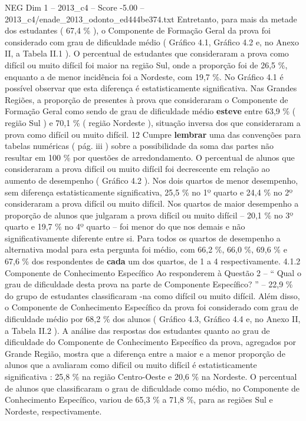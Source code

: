 \begin{textsample}{NEG Dim 1 – 2013\_c4 – Score -5.00 – 2013\_c4/enade\_2013\_odonto\_ed444be374.txt}
Entretanto, para mais da metade dos estudantes ( 67,4 \% ), o Componente de Formação Geral da prova foi considerado com grau de dificuldade médio ( Gráfico 4.1, Gráfico 4.2 e, no Anexo II, a Tabela II.1 ).
O percentual de estudantes que consideraram a prova como difícil ou muito difícil foi maior na região Sul, onde a proporção foi de 26,5 \%, enquanto a de menor incidência foi a Nordeste, com 19,7 \%.
No Gráfico 4.1 é possível observar que esta diferença é estatisticamente significativa.
Nas Grandes Regiões, a proporção de presentes à prova que consideraram o Componente de Formação Geral como sendo de grau de dificuldade médio \textbf{esteve} entre 63,9 \% ( região Sul ) e 70,1 \% ( região Nordeste ), situação inversa dos que consideraram a prova como difícil ou muito difícil. 12 Cumpre \textbf{lembrar} uma das convenções para tabelas numéricas ( pág. iii ) sobre a possibilidade da soma das partes não resultar em 100 \% por questões de arredondamento.
O percentual de alunos que consideraram a prova difícil ou muito difícil foi decrescente em relação ao aumento de desempenho ( Gráfico 4.2 ).
Nos dois quartos de menor desempenho, sem diferença estatisticamente significativa, 25,5 \% no 1º quarto e 24,4 \% no 2º consideraram a prova difícil ou muito difícil.
Nos quartos de maior desempenho a proporção de alunos que julgaram a prova difícil ou muito difícil – 20,1 \% no 3º quarto e 19,7 \% no 4º quarto – foi menor do que nos demais e não significativamente diferente entre si.
Para todos os quartos de desempenho a alternativa modal para esta pergunta foi médio, com 66,2 \%, 66,0 \%, 69,6 \% e 67,6 \% dos respondentes de \textbf{cada} um dos quartos, de 1 a 4 respectivamente. 4.1.2 Componente de Conhecimento Específico Ao responderem à Questão 2 – “ Qual o grau de dificuldade desta prova na parte de Componente Específico? ” – 22,9 \% do grupo de estudantes classificaram -na como difícil ou muito difícil.
Além disso, o Componente de Conhecimento Específico da prova foi considerado com grau de dificuldade médio por 68,2 \% dos alunos ( Gráfico 4.3, Gráfico 4.4 e, no Anexo II, a Tabela II.2 ).
A análise das respostas dos estudantes quanto ao grau de dificuldade do Componente de Conhecimento Específico da prova, agregados por Grande Região, mostra que a diferença entre a maior e a menor proporção de alunos que a avaliaram como difícil ou muito difícil é estatisticamente significativa : 25,8 \% na região Centro-Oeste e 20,6 \% na Nordeste.
O percentual de alunos que classificaram o grau de dificuldade como médio, no Componente de Conhecimento Específico, variou de 65,3 \% a 71,8 \%, para as regiões Sul e Nordeste, respectivamente.

\end{textsample}

